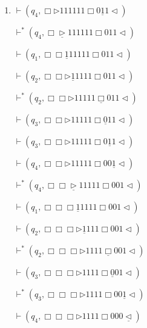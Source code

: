 \documentclass[12pt,a4paper]{article}
\makeatletter
\newtheorem*{solution}{Solution}
\theoremstyle{definition}
\renewenvironment{solution}[1][Solution] {\par\pushQED{\qed}\normalfont\topsep6\p@\@plus6\p@\relax\trivlist\item[\hskip\labelsep\bfseries#1\@addpunct{.}]\ignorespaces}{\popQED\endtrivlist\@endpefalse} \makeatother
\makeatother
\begin{document}
\begin{enumerate}
\begin{solution}
\begin{enumerate}
\begin{minipage}{0.27\textwidth}
\begin{center}
				$\vdash (q_4,\Box\triangleright  1  1  1  1  1  1  \Box 0 \underline{1} 1   \triangleleft)$
				
				$\vdash^* (q_4,\Box \underline{\triangleright}  1  1  1  1  1  1  \Box 0  1  1   \triangleleft)$
				
				
				$\vdash (q_1,\Box \Box \underline{1}  1  1  1  1  1  \Box 0  1  1   \triangleleft)$
				
				$\vdash (q_2,\Box \Box \triangleright\underline{1}  1  1  1  1  \Box 0  1  1   \triangleleft)$
				
				$\vdash^* (q_2,\Box \Box \triangleright1  1  1  1  1 \underline{\Box} 0  1  1   \triangleleft)$
				
				$\vdash (q_3,\Box \Box \triangleright1  1  1  1  1 \Box \underline{0}  1  1   \triangleleft)$
				
				$\vdash (q_3,\Box \Box \triangleright1  1  1  1  1 \Box 0 \underline{1} 1   \triangleleft)$
				
				$\vdash (q_4,\Box \Box \triangleright1  1  1  1  1 \Box 0 0 \underline{1}   \triangleleft)$
				
				$\vdash^* (q_4,\Box \Box \underline{\triangleright}1  1  1  1  1 \Box 0 0 1 \triangleleft)$
				
				
				$\vdash (q_1,\Box \Box \Box \underline{1}  1  1  1  1  \Box 0  0  1   \triangleleft)$
				
				$\vdash (q_2,\Box \Box \Box \triangleright \underline{1} 1  1  1  \Box 0  0  1   \triangleleft)$
				
				$\vdash^* (q_2,\Box \Box \Box\triangleright  1  1  1  1 \underline{\Box} 0  0  1   \triangleleft)$
				
				$\vdash (q_3,\Box \Box \Box\triangleright  1  1  1  1 \Box \underline{0} 0  1   \triangleleft)$
				
				$\vdash^* (q_3,\Box \Box \Box\triangleright  1  1  1  1 \Box 0 0\underline{1}  \triangleleft)$
				
				$\vdash (q_4,\Box \Box \Box\triangleright  1  1  1  1 \Box 0 0 0\underline{\triangleleft})$
			\end{center}
		\end{minipage}
		\begin{minipage}{0.27\textwidth}
			\begin{center}
				

\end{center}
\end{minipage}
\end{enumerate}
\end{solution}
\end{enumerate}
\end{document}
